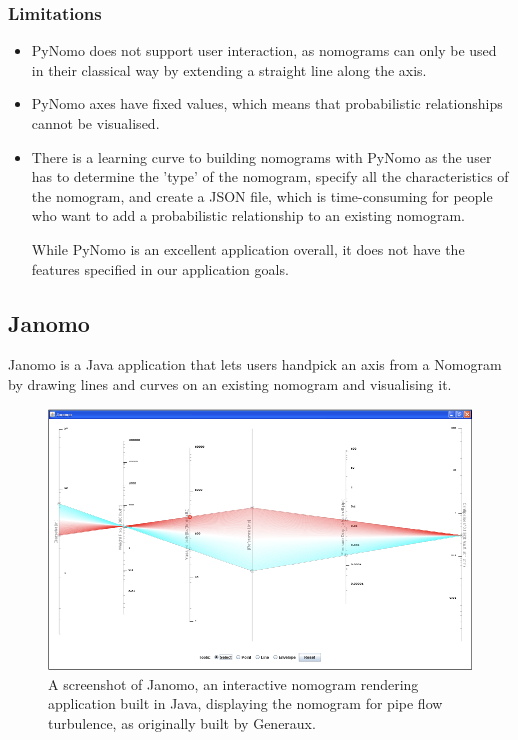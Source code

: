 \documentclass{l4proj}
\begin{document}
\subsubsection{{Limitations}}

\begin{itemize}
    \item PyNomo does not support user interaction, as nomograms can only be used in their classical way by extending a straight line along the axis. 
    \item PyNomo axes have fixed values, which means that probabilistic relationships cannot be visualised. 
    \item There is a learning curve to building nomograms with PyNomo as the user has to determine the 'type' of the nomogram, specify all the characteristics of the nomogram, and create a JSON file, which is time-consuming for people who want to add a probabilistic relationship to an existing nomogram.  

    While PyNomo is an excellent application overall, it does not have the features specified in our application goals. 

    
\end{itemize}


\subsection{Janomo}

Janomo is a Java application that lets users handpick an axis from a Nomogram by drawing lines and curves on an existing nomogram and visualising it. 

\begin{figure} [H]
    \centering
    \includegraphics[width=.8\linewidth]{dissertation/images/myFigures/background/janomo.png}
    \caption{A screenshot of Janomo, an interactive nomogram rendering application built in Java, displaying the nomogram for pipe flow turbulence, as originally built by Generaux. \citep{howison_constructing_nodate}}
    \label{fig:janomo}
\end{figure} 
\end{document}
